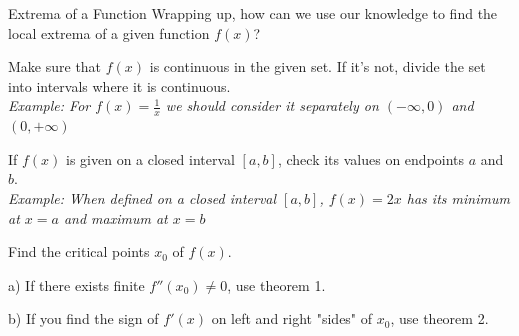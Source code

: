 \documentclass{beamer}
\begin{document}
\begin{frame}{Extrema of a Function}
Wrapping up, how can we use our knowledge to find the local extrema of a given function $f(x)$?
\pause
\begin{description}[<+->]
    \item[Step 0:] Make sure that $f(x)$ is continuous in the given set. If it's not, divide the set into intervals where it is continuous.\\\textit{\small Example: For $f(x)=\frac{1}{x}$ we should consider it separately on $(-\infty,0)$ and $(0, +\infty)$}
    
    \item[Step 1:] If $f(x)$ is given on a closed interval $[a,b]$, check its values on endpoints $a$ and $b$.
    \\\textit{\small Example: When defined on a closed interval $[a,b]$, $f(x)=2x$ has its minimum at $x=a$ and maximum at $x=b$}
    
    \item[Step 2:] Find the critical points $x_0$ of $f(x)$.

    \item[Step 3:] a) If there exists finite $f''(x_0)\ne 0$, use theorem 1.

    b) If you find the sign of $f'(x)$ on left and right "sides" of $x_0$, use theorem 2.
    
\end{description}
\end{frame}
\end{document}
